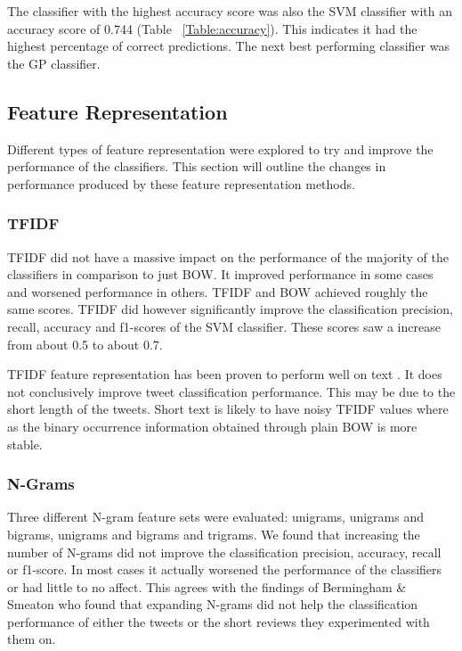The classifier with the highest accuracy score was also the SVM classifier with an accuracy score of 0.744 (Table ~\ref{Table:accuracy}). This indicates it had the highest percentage of correct predictions. The next best performing classifier was the GP classifier.

\subsection{Feature Representation}

Different types of feature representation were explored to try and improve the performance of the classifiers. This section will outline the changes in performance produced by these feature representation methods. 

\subsubsection*{TFIDF}
TFIDF did not have a massive impact on the performance of the majority of the classifiers in comparison to just BOW. It improved performance in some cases and worsened performance in others. TFIDF and BOW achieved roughly the same scores. TFIDF did however significantly improve the classification precision, recall, accuracy and f1-scores of the SVM classifier. These scores saw a increase from about 0.5 to about 0.7.

TFIDF feature representation has been proven to perform  well on text \cite{}. It does not conclusively improve tweet classification performance. This may be due to the short length of the tweets. Short text is likely to have noisy TFIDF values where as the binary occurrence information obtained through plain BOW is more stable.

\subsubsection*{N-Grams}
Three different N-gram feature sets were evaluated: unigrams, unigrams and bigrams, unigrams and bigrams and trigrams. We found that increasing the number of N-grams did not improve the classification precision, accuracy, recall or f1-score. In most cases it actually worsened the performance of the classifiers or had little to no affect. This agrees with the findings of Bermingham & Smeaton \cite{Berm2010} who found that expanding N-grams did not help the classification performance of either the tweets or the short reviews they experimented with them on. 

